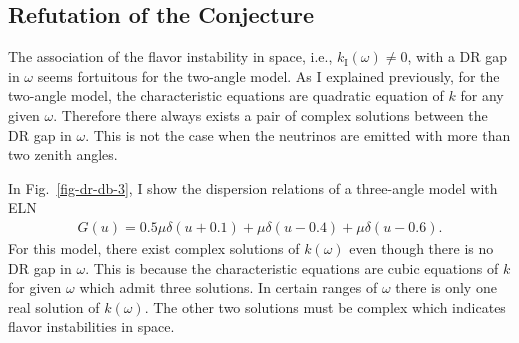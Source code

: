 \subsection{\label{chap:collective-sec:fast-mode-subsec:instability-to-gap}Refutation of the Conjecture}

The association of the flavor instability in space, i.e., $k_{\mathrm I}(\omega)\neq 0$, with a DR gap in $\omega$ seems fortuitous for the two-angle model. As I explained previously, for the two-angle model, the characteristic equations are quadratic equation of $k$ for any given $\omega$. Therefore there always exists a pair of complex solutions between the DR gap in $\omega$. This is not the case when the neutrinos are emitted with more than two zenith angles.

In Fig.~\ref{fig-dr-db-3}, I show the dispersion relations of a three-angle model with ELN
\begin{align}
    G(u) = 0.5\mu \delta(u+0.1) + \mu \delta(u - 0.4) + \mu \delta(u-0.6).
\end{align}
For this model, there exist complex solutions of $k(\omega)$ even though there is no DR gap in $\omega$. This is because the characteristic equations are cubic equations of $k$ for given $\omega$ which admit three solutions. In certain ranges of $\omega$ there is only one real solution of $k(\omega)$. The other two solutions must be complex which indicates flavor instabilities in space.




